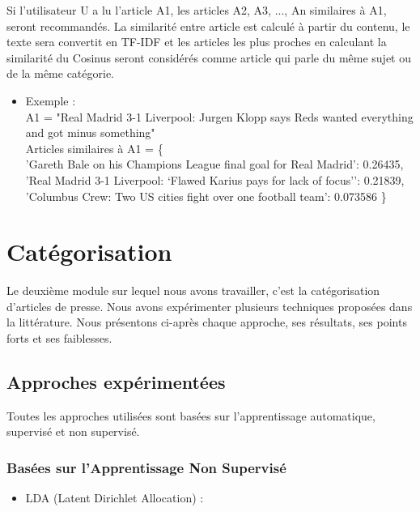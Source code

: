 Si l'utilisateur U a lu l'article A1, les articles A2, A3, ..., An similaires à A1, seront recommandés. La similarité entre article est calculé à partir du contenu, le texte sera convertit en TF-IDF et les articles les plus proches en calculant la similarité du Cosinus seront considérés comme article qui parle du même sujet ou de la même catégorie.

\begin{itemize}[leftmargin=*]
    \item Exemple :\\ 
    A1 = "Real Madrid 3-1 Liverpool: Jurgen Klopp says Reds wanted everything and got minus something"\\
    Articles similaires à A1 = \{\\
    'Gareth Bale on his Champions League final goal for Real Madrid': 0.26435,\\
    'Real Madrid 3-1 Liverpool: ‘Flawed Karius pays for lack of focus’': 0.21839,\\
    'Columbus Crew: Two US cities fight over one football team': 0.073586
    \}
\end{itemize} 

\section{Catégorisation}
    Le deuxième module sur lequel nous avons travailler, c'est la catégorisation d'articles de presse. Nous avons expérimenter plusieurs techniques proposées dans la littérature. Nous présentons ci-après chaque approche, ses résultats, ses points forts et ses faiblesses.
    \subsection{Approches expérimentées\label{approches}}
        Toutes les approches utilisées sont basées sur l'apprentissage automatique, supervisé et non supervisé. 
        \subsubsection{Basées sur l'Apprentissage Non Supervisé}
            \begin{itemize}
                \item{LDA (Latent Dirichlet Allocation) : }
            \end{itemize}

